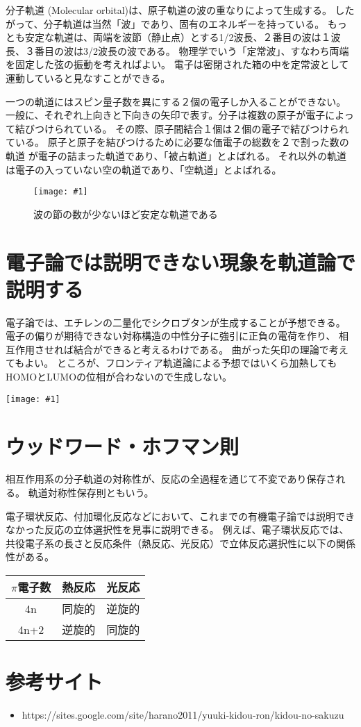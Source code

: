 \documentclass[a4paper,papersize,dvipdfmx]{jsarticle}
\newcommand{\pict}[2]{\begin{center} \texttt{[image: \#1]} \end{center}}   %
\newcommand{\piccap}[3]{\begin{figure}[H] \centering \texttt{[image: \#1]} \caption{#3} \label{fig {#1}} \end{figure}} %
\begin{document}
分子軌道 (Molecular orbital)は、原子軌道の波の重なりによって生成する。
したがって、分子軌道は当然「波」であり、固有のエネルギーを持っている。
もっとも安定な軌道は、両端を波節（静止点）とする1/2波長、２番目の波は１波長、３番目の波は3/2波長の波である。
物理学でいう「定常波」、すなわち両端を固定した弦の振動を考えればよい。
電子は密閉された箱の中を定常波として運動していると見なすことができる。

一つの軌道にはスピン量子数を異にする２個の電子しか入ることができない。
一般に、それぞれ上向きと下向きの矢印で表す。分子は複数の原子が電子によって結びつけられている。
その際、原子間結合１個は２個の電子で結びつけられている。
原子と原子を結びつけるために必要な価電子の総数を２で割った数の軌道 が電子の詰まった軌道であり、「被占軌道」とよばれる。
それ以外の軌道は電子の入っていない空の軌道であり、「空軌道」とよばれる。

\piccap{image/wave.png}{12}{波の節の数が少ないほど安定な軌道である}

\section{電子論では説明できない現象を軌道論で説明する}
電子論では、エチレンの二量化でシクロブタンが生成することが予想できる。
電子の偏りが期待できない対称構造の中性分子に強引に正負の電荷を作り、
相互作用させれば結合ができると考えるわけである。
曲がった矢印の理論で考えてもよい。
ところが、フロンティア軌道論による予想ではいくら加熱してもHOMOとLUMOの位相が合わないので生成しない。

\pict{image/04.png}{12}

\section{ウッドワード・ホフマン則}

\begin{tcolorbox}
相互作⽤系の分⼦軌道の対称性が、反応の全過程を通じて不変であり保存される。
軌道対称性保存則ともいう。
\end{tcolorbox}


電⼦環状反応、付加環化反応などにおいて、これまでの有機電⼦論では説明できなかった反応の⽴体選択性を⾒事に説明できる。
例えば、電⼦環状反応では、共役電⼦系の⻑さと反応条件（熱反応、光反応）で⽴体反応選択性に以下の関係性がある。

\begin{table}[H]
\centering
\begin{tabular}{|c|c|c|}
\hline
$\pi$電子数 & 熱反応 & 光反応 \\ \hline
4n & 同旋的 & 逆旋的 \\ \hline
4n+2     & 逆旋的 & 同旋的 \\ \hline
\end{tabular}
\end{table}

\section{参考サイト}
\begin{itemize}
\item https://sites.google.com/site/harano2011/yuuki-kidou-ron/kidou-no-sakuzu
\end{itemize}
\end{document}
